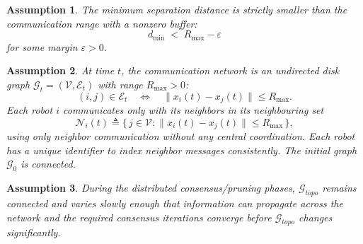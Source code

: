 \documentclass[conference]{IEEEconf}
\theoremstyle{plain}
\newtheorem{assumption}{Assumption}
\begin{document}
\begin{assumption}
\label{ass:A2}
The minimum separation distance is strictly smaller than the communication range with a nonzero buffer:
\begin{equation}
d_{\min} \;<\; R_{\max} - \varepsilon
\label{eq:A3}
\end{equation}
for some margin $\varepsilon>0$.
\end{assumption}

\begin{assumption}
\label{ass:A3}
At time $t$, the communication network is an undirected disk graph $\mathcal{G}_t=(\mathcal{V},\mathcal{E}_t)$ with range $R_{\max}>0$:
\begin{equation}
(i,j)\in\mathcal{E}_t \quad \Longleftrightarrow \quad \|x_i(t)-x_j(t)\|\le R_{\max}.
\label{eq:disk_graph}
\end{equation}
Each robot $i$ communicates only with its neighbors in its neighbouring set
\begin{equation}
\mathcal{N}_i(t) \triangleq \{\, j\in\mathcal{V} : \|x_i(t)-x_j(t)\|\le R_{\max}\,\},
\label{eq:neighbors}
\end{equation}
using only neighbor communication without any central coordination. Each robot has a unique identifier to index neighbor messages consistently. The initial graph $\mathcal{G}_0$ is connected.
\end{assumption}

\begin{assumption}
\label{ass:A4}
    During the distributed consensus/pruning phases, $\mathcal{G}_{topo}$ remains connected and varies slowly enough that information can propagate across the network and the required consensus iterations converge before $\mathcal{G}_{topo}$ changes significantly.
\end{assumption}

\end{document}
